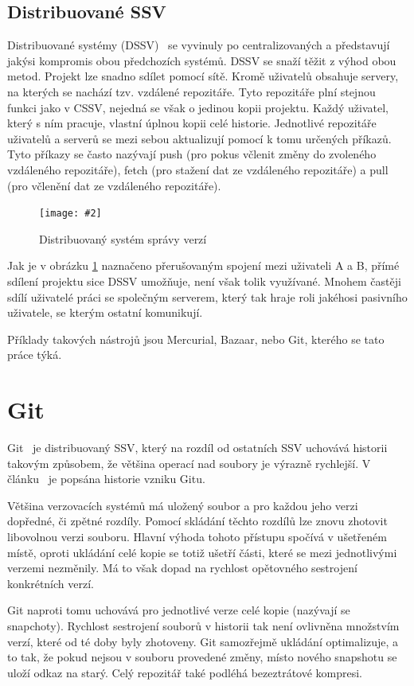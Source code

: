 \documentclass[
  biblatex,
  glossaries,
  index
]{kidiplom}
\newcommand{\pic}[4]{
\begin{figure}[h]
\centering
\texttt{[image: \#2]}
\caption{#3}
\label{fig:#4}
\end{figure}}
\begin{document}
\subsection{Distribuované SSV}
Distribuované systémy (DSSV)~\cite{otte} se vyvinuly po centralizovaných a představují 
jakýsi kompromis obou předchozích systémů. DSSV se snaží těžit z výhod obou 
metod. Projekt lze snadno sdílet pomocí sítě. Kromě uživatelů obsahuje 
servery, na kterých se nachází tzv. vzdálené repozitáře. Tyto repozitáře 
plní stejnou funkci jako v CSSV, nejedná se však o jedinou kopii projektu.
Každý uživatel, který s ním pracuje, vlastní úplnou kopii
celé historie. Jednotlivé repozitáře uživatelů a serverů se mezi sebou 		
aktualizují pomocí k tomu určených příkazů. Tyto příkazy se často nazývají
push (pro pokus včlenit změny do zvoleného vzdáleného repozitáře), fetch
(pro stažení dat ze vzdáleného repozitáře) a pull (pro včlenění dat ze 
vzdáleného repozitáře).

\pic{10cm}{distributed.png}{Distribuovaný systém správy verzí}{distributed}

Jak je v obrázku \ref{fig:distributed} \cite{gitreference} naznačeno přerušovaným spojení mezi uživateli A a B, přímé sdílení projektu sice DSSV umožňuje, není však tolik využívané. Mnohem častěji sdílí uživatelé práci se společným serverem, který tak hraje roli jakéhosi pasivního uživatele, se kterým ostatní komunikují.

Příklady takových nástrojů jsou Mercurial, Bazaar, nebo Git, kterého se
tato práce týká.

\section{Git}
Git~\cite{git} je distribuovaný SSV, který na rozdíl od ostatních SSV uchovává historii   takovým způsobem, že většina operací nad soubory je výrazně rychlejší. V článku~\cite{gitreference-history} je popsána historie vzniku Gitu.

Většina verzovacích systémů má uložený soubor a pro každou jeho verzi dopředné, či zpětné rozdíly. Pomocí skládání těchto rozdílů lze znovu zhotovit libovolnou verzi souboru. Hlavní výhoda tohoto přístupu spočívá v ušetřeném místě, oproti ukládání celé kopie se totiž ušetří části, které se mezi jednotlivými verzemi nezměnily. Má to však dopad na rychlost opětovného sestrojení  konkrétních verzí.

Git naproti tomu uchovává pro jednotlivé verze celé kopie (nazývají se snapchoty). Rychlost sestrojení souborů v historii tak není ovlivněna množstvím verzí, které od té doby byly zhotoveny. Git samozřejmě ukládání optimalizuje, a to tak, že pokud nejsou v souboru provedené změny, místo nového snapshotu se uloží odkaz na starý. Celý repozitář také podléhá bezeztrátové kompresi.
\end{document}
